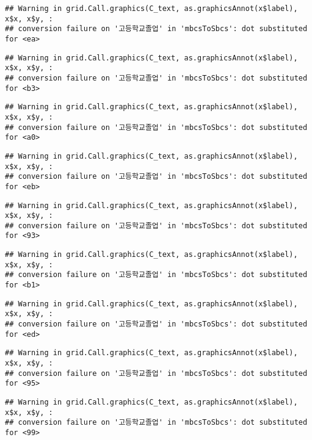 \documentclass[
]{article}
\begin{document}
\begin{verbatim}
## Warning in grid.Call.graphics(C_text, as.graphicsAnnot(x$label), x$x, x$y, :
## conversion failure on '고등학교졸업' in 'mbcsToSbcs': dot substituted for <ea>
\end{verbatim}

\begin{verbatim}
## Warning in grid.Call.graphics(C_text, as.graphicsAnnot(x$label), x$x, x$y, :
## conversion failure on '고등학교졸업' in 'mbcsToSbcs': dot substituted for <b3>
\end{verbatim}

\begin{verbatim}
## Warning in grid.Call.graphics(C_text, as.graphicsAnnot(x$label), x$x, x$y, :
## conversion failure on '고등학교졸업' in 'mbcsToSbcs': dot substituted for <a0>
\end{verbatim}

\begin{verbatim}
## Warning in grid.Call.graphics(C_text, as.graphicsAnnot(x$label), x$x, x$y, :
## conversion failure on '고등학교졸업' in 'mbcsToSbcs': dot substituted for <eb>
\end{verbatim}

\begin{verbatim}
## Warning in grid.Call.graphics(C_text, as.graphicsAnnot(x$label), x$x, x$y, :
## conversion failure on '고등학교졸업' in 'mbcsToSbcs': dot substituted for <93>
\end{verbatim}

\begin{verbatim}
## Warning in grid.Call.graphics(C_text, as.graphicsAnnot(x$label), x$x, x$y, :
## conversion failure on '고등학교졸업' in 'mbcsToSbcs': dot substituted for <b1>
\end{verbatim}

\begin{verbatim}
## Warning in grid.Call.graphics(C_text, as.graphicsAnnot(x$label), x$x, x$y, :
## conversion failure on '고등학교졸업' in 'mbcsToSbcs': dot substituted for <ed>
\end{verbatim}

\begin{verbatim}
## Warning in grid.Call.graphics(C_text, as.graphicsAnnot(x$label), x$x, x$y, :
## conversion failure on '고등학교졸업' in 'mbcsToSbcs': dot substituted for <95>
\end{verbatim}

\begin{verbatim}
## Warning in grid.Call.graphics(C_text, as.graphicsAnnot(x$label), x$x, x$y, :
## conversion failure on '고등학교졸업' in 'mbcsToSbcs': dot substituted for <99>
\end{verbatim}
\end{document}
